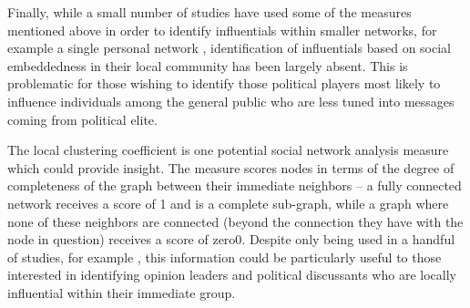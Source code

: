 \documentclass[a4paper,12pt]{article}
\begin{document}
Finally, while a small number of studies have used some of the measures mentioned above in order to identify influentials within smaller networks, for example a single personal network \cite{gruzdwellmantakhteyev}, identification of influentials based on social embeddedness in their local community has been largely absent. This is problematic for those wishing to identify those political players most likely to influence individuals among the general public who are less tuned into messages coming from political elite.

The local clustering coefficient is one potential social network analysis measure which could provide insight. The measure scores nodes in terms of the degree of completeness of the graph between their immediate neighbors -- a fully connected network receives a score of 1 and is a complete sub-graph, while a graph where none of these neighbors are connected (beyond the connection they have with the node in question) receives a score of zero0. Despite only being used in a handful of studies, for example \cite{Bigonha2011, Sousa}, this information could be particularly useful to those interested in identifying opinion leaders and political discussants who are locally influential within their immediate group.



\end{document}
